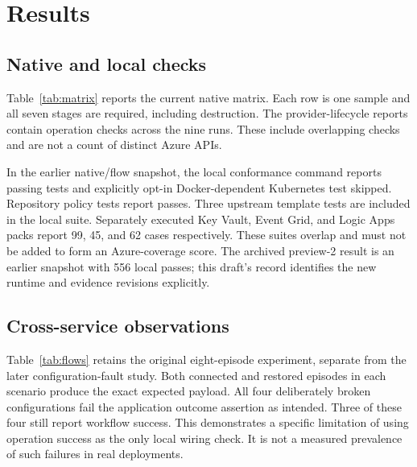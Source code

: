 \documentclass[10pt,a4paper]{article}
\begin{document}
\section{Results}
\subsection{Native and local checks}
Table~\ref{tab:matrix} reports the current native matrix. Each row is one sample and all seven stages are required, including destruction. The provider-lifecycle reports contain \ProviderOperationCount{} operation checks across the nine runs. These include overlapping checks and are not a count of distinct Azure APIs.

\begin{table}[ht]
\centering\small
\caption{Native smoke matrix. Each row has one sample.}\label{tab:matrix}

\end{table}

In the earlier native/flow snapshot, the local conformance command reports \LocalPassed{} passing tests and \LocalSkipped{} explicitly opt-in Docker-dependent Kubernetes test skipped. Repository policy tests report \RepositoryPassed{} passes. Three upstream template tests are included in the local suite. Separately executed Key Vault, Event Grid, and Logic Apps packs report 99, 45, and 62 cases respectively. These suites overlap and must not be added to form an Azure-coverage score. The archived preview-2 result is an earlier snapshot with 556 local passes; this draft's record identifies the new runtime and evidence revisions explicitly.

\subsection{Cross-service observations}
Table~\ref{tab:flows} retains the original eight-episode experiment, separate from the later configuration-fault study. Both connected and restored episodes in each scenario produce the exact expected payload. All four deliberately broken configurations fail the application outcome assertion as intended. Three of these four still report workflow success. This demonstrates a specific limitation of using operation success as the only local wiring check. It is not a measured prevalence of such failures in real deployments.

\begin{table}[ht]
\centering\small
\caption{Constructed controls and positive episodes. ``No'' in the outcome column is expected for the broken configurations.}\label{tab:flows}

\end{table}
\end{document}
